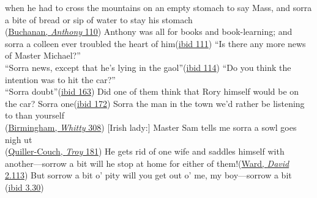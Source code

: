 \ea \label{ex:04-203}
\ea
when he had to cross the mountains on an empty stomach to say Mass, and sorra a bite of bread or sip of water to stay his stomach\\\hfill(\href{https://archive.org/details/fatheranthonyar00buchgoog/page/n122/mode/2up?q=sorra&view=theater}{Buchanan, \textit{Anthony} 110}) %
\ex
Anthony was all for books and book-learning; and sorra a colleen ever troubled the heart of him\hfill(\href{https://archive.org/details/fatheranthonyar00buchgoog/page/n122/mode/2up?q=sorra&view=theater}{ibid 111})
\ex
``Is there any more news of Master Michael?''\\``Sorra news, except that he's lying in the gaol''\hfill(\href{https://archive.org/details/fatheranthonyar00buchgoog/page/n128/mode/2up?q=sorra&view=theater}{ibid 114}) %
\ex
``Do you think the intention was to hit the car?''\\``Sorra doubt''\hfill(\href{https://archive.org/details/fatheranthonyar00buchgoog/page/n172/mode/2up?q=\%22intention+was+to+hit\%22&view=theater}{ibid 163})
\ex
Did one of them think that Rory himself would be on the car? Sorra one\hfill(\href{https://archive.org/details/fatheranthonyar00buchgoog/page/n182/mode/2up?q=sorra&view=theater}{ibid 172}) %
\ex
Sorra the man in the town we'd rather be listening to than yourself\\\hfill(\href{https://archive.org/details/advofdrwhitty00birmiala/page/308/mode/2up?q=\%22sorra+the+man+in+the+town\%22&view=theater}{Birmingham, \textit{Whitty} 308})
\ex
{[}Irish lady:{]} Master Sam tells me sorra a sowl goes nigh ut\\\hfill(\href{https://archive.org/details/astonishinghisto0000quil_t3y6/page/180/mode/2up?q=\%22sorra+a+sowl\%22&view=theater}{Quiller-Couch, \textit{Troy} 181}) %
\ex
He gets rid of one wife and saddles himself with another---sorrow a bit will he stop at home for either of them!\hfill(\href{https://archive.org/details/historydavidgri02wardgoog/page/254/mode/2up?q=\%22gets+rid+of+one+wife\%22&view=theater}{Ward, \textit{David} 2.113}) %
\ex
But sorrow a bit o' pity will you get out o' me, my boy---sorrow a bit\\\hfill(\href{https://archive.org/details/historyofdavidgri03ward/page/30/mode/2up?q=\%22But+sorrow+a+bit+o%27+pity+will+you+get+out+o%27+me%2C+my+boy\%22&view=theater}{ibid 3.30})
\z
\z

